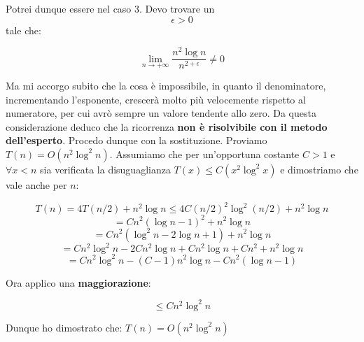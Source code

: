 Potrei dunque essere nel caso 3. Devo trovare un $$\epsilon > 0$$  tale che:

$$\lim_{n \to +\infty}\frac{n^2\log n}{n^{2+\epsilon}}\neq0$$

Ma mi accorgo subito che la cosa è impossibile, in quanto il denominatore, incrementando l'esponente, crescerà molto più velocemente rispetto al numeratore, per cui avrò sempre un valore tendente allo zero. Da questa considerazione deduco che la ricorrenza \textbf{non è risolvibile con il metodo dell'esperto}.
\linebreak
\linebreak
Procedo dunque con la sostituzione. Proviamo $T(n)=O(n^2\log^2n)$. Assumiamo che per un'opportuna costante $C>1$ e $\forall x<n$ sia verificata la disuguaglianza $T(x)\le C(x^2\log^2x)$ e dimostriamo che vale anche per $n$:

$$T(n)=4T(n/2)+n^2\log n \le 4C(n/2)^2\log^2(n/2)+n^2\log n$$
$$=Cn^2(\log n -1)^2+n^2\log n$$
$$=Cn^2(\log^2n-2\log n+1)+n^2\log n$$
$$=Cn^2\log^2n-2Cn^2\log n +Cn^2\log n+Cn^2+n^2\log n$$
$$=Cn^2\log^2n-(C-1)n^2\log n-Cn^2(\log n -1)$$

Ora applico una \textbf{maggiorazione}:

$$\le Cn^2\log^2n$$

Dunque ho dimostrato che: $T(n)=O(n^2\log^2n)$
